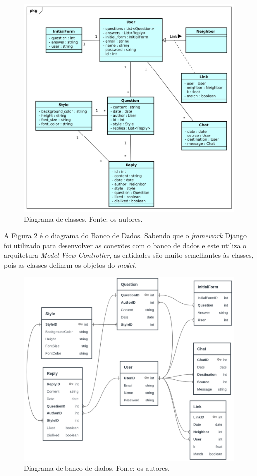\begin{figure}[!htb]
\centering
\includegraphics[width=16cm]{DiagramaClasse.png}
\caption{Diagrama de classes. Fonte: os autores.}
\label{fig:diagramaClasse}
\end{figure}

A Figura \ref{fig:diagramaBD} é o diagrama do Banco de Dados. Sabendo que o \emph{framework} Django foi utilizado para desenvolver as conexões com o banco de dados e este utiliza o arquitetura \emph{Model-View-Controller}, as entidades são muito semelhantes às classes, pois as classes definem os objetos do \emph{model}.

\begin{figure}[!htb]
\centering
\includegraphics[width=16cm]{diagrama_bd.png}
\caption{Diagrama de banco de dados. Fonte: os autores.}
\label{fig:diagramaBD}
\end{figure}


